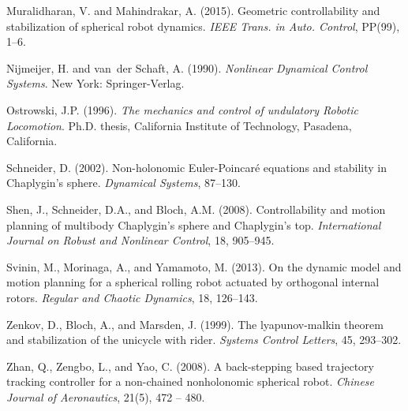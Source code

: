 \documentclass{ifacconf}
\begin{document}
\begin{thebibliography}{26}
Muralidharan, V. and Mahindrakar, A. (2015).
\newblock Geometric controllability and stabilization of spherical robot
  dynamics.
\newblock \emph{{IEEE} {T}rans. in {A}uto. {C}ontrol}, PP(99), 1--6.

Nijmeijer, H. and van~der Schaft, A. (1990).
\newblock \emph{Nonlinear Dynamical Control Systems}.
\newblock New York: Springer-Verlag.

Ostrowski, J.P. (1996).
\newblock \emph{The mechanics and control of undulatory Robotic Locomotion}.
\newblock Ph.D. thesis, California Institute of Technology, Pasadena,
  California.

Schneider, D. (2002).
\newblock Non-holonomic {E}uler-{P}oincar\'{e} equations and stability in
  {C}haplygin's sphere.
\newblock \emph{Dynamical Systems}, 87--130.

Shen, J., Schneider, D.A., and Bloch, A.M. (2008).
\newblock Controllability and motion planning of multibody {C}haplygin's sphere
  and {C}haplygin's top.
\newblock \emph{International Journal on Robust and Nonlinear Control}, 18,
  905--945.

Svinin, M., Morinaga, A., and Yamamoto, M. (2013).
\newblock On the dynamic model and motion planning for a spherical rolling
  robot actuated by orthogonal internal rotors.
\newblock \emph{Regular and Chaotic Dynamics}, 18, 126--143.

Zenkov, D., Bloch, A., and Marsden, J. (1999).
\newblock The lyapunov-malkin theorem and stabilization of the unicycle with
  rider.
\newblock \emph{Systems Control Letters}, 45, 293--302.

Zhan, Q., Zengbo, L., and Yao, C. (2008).
\newblock A back-stepping based trajectory tracking controller for a
  non-chained nonholonomic spherical robot.
\newblock \emph{Chinese Journal of Aeronautics}, 21(5), 472 -- 480.

\end{thebibliography}
\end{document}
